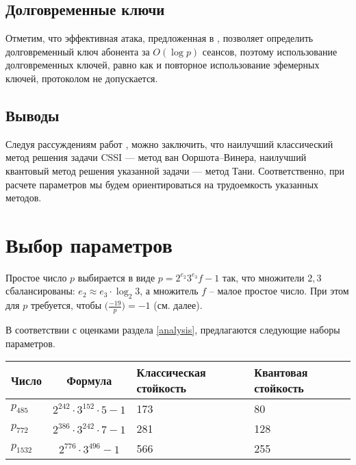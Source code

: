 \documentclass[a4paper,12pt]{article}
\theoremstyle{definition}
\begin{document}


\subsection*{Долговременные ключи}

Отметим, что эффективная атака, предложенная в \cite{sec}, позволяет определить долговременный ключ абонента за $O(\log p)$ сеансов, поэтому использование долговременных ключей,
равно как и повторное использование эфемерных ключей, протоколом не допускается.

\subsection*{Выводы}

Следуя рассуждениям работ \cite{Adj, FFF}, можно заключить, что наилучший классический метод решения задачи CSSI --- метод ван Ооршота--Винера, наилучший квантовый метод решения указанной задачи ---
метод Тани. Соответственно, при расчете параметров мы будем ориентироваться на трудоемкость указанных методов.


\section{Выбор параметров}\label{parampampam}

Простое число  $p$ выбирается в виде $p=2^{e_2}3^{e_3}f-1$ так, что множители $2,3$ сбалансированы:  $e_2\approx e_3 \cdot \log_2 3$, а множитель $f$ -- малое простое число. 
При этом для $p$ требуется, чтобы
$\big(\frac{-19}{p}\big) = -1$ (см. далее).

В соответствии с оценками раздела \ref{analysis}, предлагаются следующие наборы параметров. %

\begin{center}
 \begin{tabular}{|l|c|p{3cm}|p{3cm}|}
 \hline
 Число & Формула & Классическая стойкость & Квантовая стойкость \\
 \hline
 $p_{485}$ & $2^{242} \cdot 3^{152} \cdot 5 -1$ & 173  & 80 \\
 \hline
 $p_{772}$ & $2^{386} \cdot 3^{242} \cdot 7-1$ & 281 & 128 \\
 \hline
 $p_{1532}$ & $2^{776} \cdot 3^{496} -1 $ & 566 & 255 \\
 \hline
 \end{tabular}

\end{center}
\end{document}
